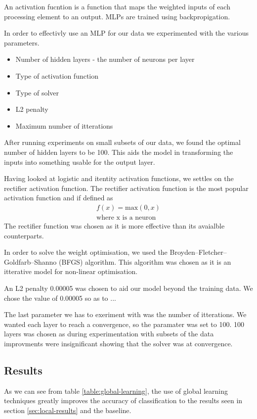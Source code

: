 \documentclass[bsc,frontabs,twoside,singlespacing,parskip,deptreport]{infthesis}     %
\begin{document}
An activation fucntion is a function that maps the weighted inputs of each processing element to an output.
MLPs are trained using backpropigation.


In order to effectivly use an MLP for our data we experimented with the various parameters.
\begin{itemize}
  \item Number of hidden layers - the number of neurons per layer
  \item Type of activation function
  \item Type of solver
  \item L2 penalty
  \item Maximum number of itterations
\end{itemize}

After running experiments on  small subsets of our data, we found the optimal number of hidden layers to be 100. 
This aids the model in transforming the inputs into something usable for the output layer.

Having looked at logistic and itentity activation functions, we settles on the rectifier activation function.
The rectifier activation function is the most popular activation function \cite{lecun2015deep} and if defined as
\begin{eqnarray}
  f(x) = \text{max}(0,x)\nonumber\\
  \text{where x is a neuron}\nonumber
\end{eqnarray}
The rectifier function was chosen as it is more effective than its avaialble counterparts\cite{glorot2011deep}.

In order to solve the weight optimisation, we used the Broyden–Fletcher–Goldfarb–Shanno (BFGS) algorithm.
This algorithm was chosen as it is an itterative model for non-linear optimisation.

An L2 penalty 0.00005 was chosen to aid our model beyond the training data.
We chose the value of 0.00005 so as to ...

The last parameter we has to exeriment with was the number of itterations.
We wanted each layer to reach a convergence, so the paramater was set to 100.
100 layers was chosen as during experimentation with subsets of the data improvments were insignificant showing that the solver was at convergence.


\subsection{Results}
As we can see from table \ref{table:global-learning},  the use of global learning techniques greatly improves the accuracy
of classification to the results seen in section \ref{sec:local-results} and the baseline.
\end{document}
